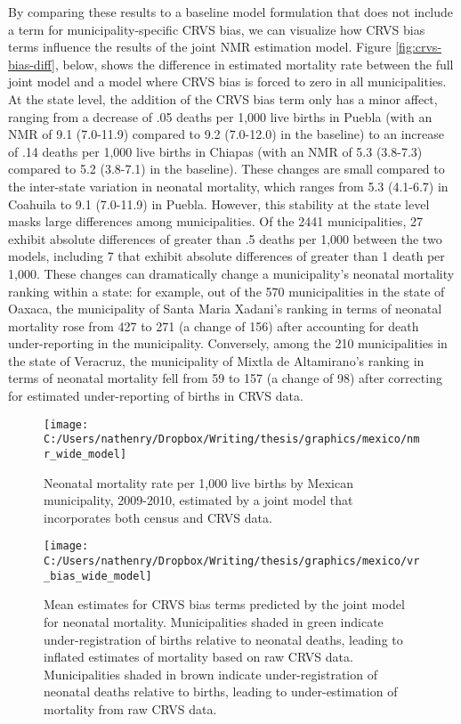 \documentclass[
]{article}
\begin{document}
By comparing these results to a baseline model formulation that does not include a term for municipality-specific CRVS bias, we can visualize how CRVS bias terms influence the results of the joint NMR estimation model. Figure \ref{fig:crvs-bias-diff}, below, shows the difference in estimated mortality rate between the full joint model and a model where CRVS bias is forced to zero in all municipalities. At the state level, the addition of the CRVS bias term only has a minor affect, ranging from a decrease of .05 deaths per 1,000 live births in Puebla (with an NMR of 9.1 (7.0-11.9) compared to 9.2 (7.0-12.0) in the baseline) to an increase of .14 deaths per 1,000 live births in Chiapas (with an NMR of 5.3 (3.8-7.3) compared to 5.2 (3.8-7.1) in the baseline). These changes are small compared to the inter-state variation in neonatal mortality, which ranges from 5.3 (4.1-6.7) in Coahuila to 9.1 (7.0-11.9) in Puebla. However, this stability at the state level masks large differences among municipalities. Of the 2441 municipalities, 27 exhibit absolute differences of greater than .5 deaths per 1,000 between the two models, including 7 that exhibit absolute differences of greater than 1 death per 1,000. These changes can dramatically change a municipality's neonatal mortality ranking within a state: for example, out of the 570 municipalities in the state of Oaxaca, the municipality of Santa Maria Xadani's ranking in terms of neonatal mortality rose from 427 to 271 (a change of 156) after accounting for death under-reporting in the municipality. Conversely, among the 210 municipalities in the state of Veracruz, the municipality of Mixtla de Altamirano's ranking in terms of neonatal mortality fell from 59 to 157 (a change of 98) after correcting for estimated under-reporting of births in CRVS data.

\begin{figure}[!ht]

{\centering \texttt{[image: C:/Users/nathenry/Dropbox/Writing/thesis/graphics/mexico/nmr\_wide\_model]} 

}

\caption{Neonatal mortality rate per 1,000 live births by Mexican municipality, 2009-2010, estimated by a joint model that incorporates both census and CRVS data.}\label{fig:nmr-wide-model}
\end{figure}

\begin{figure}[!ht]

{\centering \texttt{[image: C:/Users/nathenry/Dropbox/Writing/thesis/graphics/mexico/vr\_bias\_wide\_model]} 

}

\caption{Mean estimates for CRVS bias terms predicted by the joint model for neonatal mortality. Municipalities shaded in green indicate under-registration of births relative to neonatal deaths, leading to inflated estimates of mortality based on raw CRVS data. Municipalities shaded in brown indicate under-registration of neonatal deaths relative to births, leading to under-estimation of mortality from raw CRVS data.}\label{fig:vr-bias-wide-model}
\end{figure}
\end{document}
